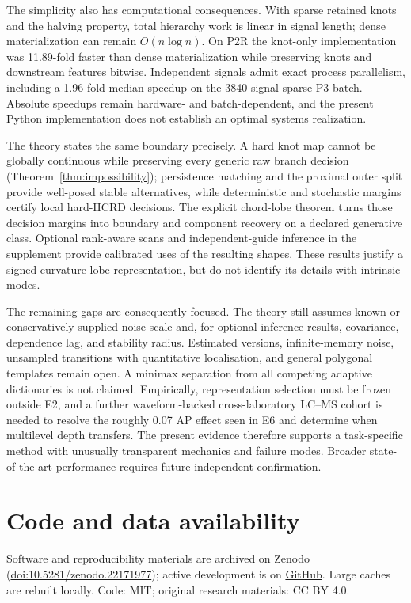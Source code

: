 \documentclass[review,onefignum,onetabnum]{siamonline250211}
\begin{document}
The simplicity also has computational consequences.  With sparse retained
knots and the halving property, total hierarchy work is linear in signal
length; dense materialization can remain $O(n\log n)$.  On P2R the knot-only
implementation was 11.89-fold faster than dense materialization while
preserving knots and downstream features bitwise.  Independent signals admit
exact process parallelism, including a 1.96-fold median speedup on the
3840-signal sparse P3 batch.  Absolute speedups remain hardware- and
batch-dependent, and the present Python implementation does not establish an
optimal systems realization.

The theory states the same boundary precisely.  A hard knot map cannot be
globally continuous while preserving every generic raw branch decision
(Theorem~\ref{thm:impossibility}); persistence matching and the proximal outer
split provide well-posed stable alternatives, while deterministic and
stochastic margins certify local hard-HCRD decisions.  The explicit
chord-lobe theorem turns those decision margins into boundary and component
recovery on a declared generative class.  Optional rank-aware scans and
independent-guide inference in the supplement provide calibrated uses of the
resulting shapes.  These results justify a signed curvature-lobe
representation, but do not identify its details with intrinsic modes.

The remaining gaps are consequently focused.  The theory still assumes known
or conservatively supplied noise scale and, for optional inference results,
covariance, dependence lag, and stability radius.  Estimated versions,
infinite-memory noise, unsampled transitions with quantitative localisation,
and general polygonal templates remain open.  A minimax separation from
all competing adaptive dictionaries is not claimed.  Empirically,
representation selection must be frozen
outside E2, and a further waveform-backed cross-laboratory LC--MS cohort is
needed to resolve the roughly 0.07 AP effect seen in E6 and determine when
multilevel depth transfers.  The present evidence therefore supports a
task-specific method with unusually transparent mechanics and failure modes.
Broader state-of-the-art performance requires future independent confirmation.
\fi

\section*{Code and data availability}
Software and reproducibility materials are archived on Zenodo
(\href{https://doi.org/10.5281/zenodo.22171977}{doi:10.5281/zenodo.22171977});
active development is on \href{https://github.com/Safreliy/hcrd}{GitHub}. Large
caches are rebuilt locally. Code: MIT; original research materials: CC BY 4.0.
\end{document}
